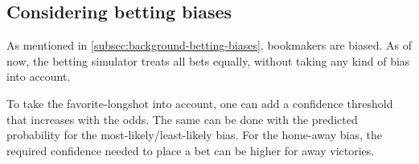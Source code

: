 \subsection{Considering betting biases}

As mentioned in \cref{subsec:background-betting-biases}, bookmakers are biased. As of now, the betting simulator treats all bets equally, without taking any kind of bias into account.

To take the favorite-longshot into account, one can add a confidence threshold that increases with the odds. The same can be done with the predicted probability for the most-likely/least-likely bias. For the home-away bias, the required confidence needed to place a bet can be higher for away victories.